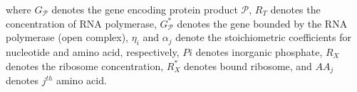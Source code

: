 \documentclass[journal=asbcd6,manuscript=article]{achemso}
\begin{document}
\begin{table}[!]
\centering
    \caption{Transcription and translation template reactions for protein production.}
    \renewcommand{\arraystretch}{1.2}
\label{tbl:parameters}
\end{table}
where $G_{\mathcal{P}}$ denotes the gene encoding protein product $\mathcal{P}$,
$R_{T}$ denotes the concentration of RNA polymerase,
$G_{\mathcal{P}}^{*}$ denotes the gene bounded by the RNA polymerase (open complex),
$\eta_{i}$ and $ \alpha_{j}$ denote the stoichiometric coefficients for nucleotide and amino acid, respectively,
$Pi$ denotes inorganic phosphate,
$R_{X}$ denotes the ribosome concentration,
$R_{X}^{*}$ denotes bound ribosome,
and $AA_{j}$ denotes $j^{th}$ amino acid.
\end{document}
